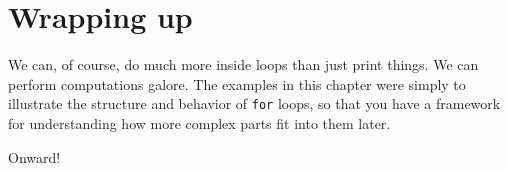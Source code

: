 \pagebreak

\section{Wrapping up}

We can, of course, do much more inside loops than just print things. We can
perform computations galore. The examples in this chapter were simply to
illustrate the structure and behavior of \texttt{for} loops, so that you have a
framework for understanding how more complex parts fit into them later.

Onward!
